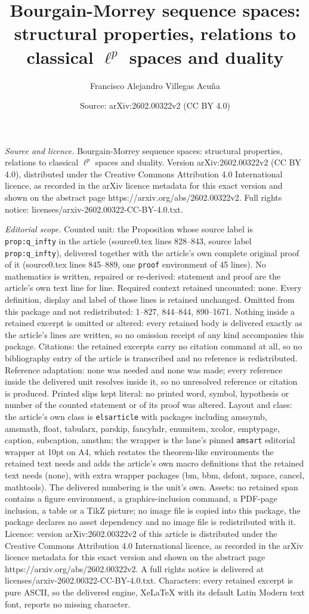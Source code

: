 \documentclass[10pt,a4paper]{amsart}
\title[Bourgain-Morrey sequence spaces: structural properties, rela]{Bourgain-Morrey sequence spaces: structural properties, relations to classical $\ell^{p}$ spaces and duality}
\author{Francisco Alejandro Villegas Acu\~na}
\date{Source: arXiv:2602.00322v2 (CC BY 4.0)}
\begin{document}
\maketitle

\noindent\emph{Source and licence.} Bourgain-Morrey sequence spaces: structural properties, relations to classical $\ell^{p}$ spaces and duality. Version arXiv:2602.00322v2 (CC BY 4.0), distributed under the Creative Commons Attribution 4.0 International licence, as recorded in the arXiv licence metadata for this exact version and shown on the abstract page https://arxiv.org/abs/2602.00322v2. Full rights notice: licenses/arxiv-2602.00322-CC-BY-4.0.txt.\par\smallskip

\noindent\textit{Editorial scope.} Counted unit: the Proposition whose source label is \texttt{prop:q\_infty} in the article (source0.tex lines 828--843, source label \texttt{prop:q\_infty}), delivered together with the article's own complete original proof of it (source0.tex lines 845--889, one \texttt{proof} environment of 45 lines). No mathematics is written, repaired or re-derived: statement and proof are the article's own text line for line. Required context retained uncounted: none. Every definition, display and label of those lines is retained unchanged. Omitted from this package and not redistributed: 1--827, 844--844, 890--1671. Nothing inside a retained excerpt is omitted or altered: every retained body is delivered exactly as the article's lines are written, so no omission receipt of any kind accompanies this package. Citations: the retained excerpts carry no citation command at all, so no bibliography entry of the article is transcribed and no reference is redistributed. Reference adaptation: none was needed and none was made; every reference inside the delivered unit resolves inside it, so no unresolved reference or citation is produced. Printed slips kept literal: no printed word, symbol, hypothesis or number of the counted statement or of its proof was altered. Layout and class: the article's own class is \texttt{elsarticle} with packages including amssymb, amsmath, float, tabularx, parskip, fancyhdr, enumitem, xcolor, emptypage, caption, subcaption, amsthm; the wrapper is the lane's pinned \texttt{amsart} editorial wrapper at 10pt on A4, which restates the theorem-like environments the retained text needs and adds the article's own macro definitions that the retained text needs (none), with extra wrapper packages (bm, bbm, dsfont, xspace, cancel, mathtools). The delivered numbering is the unit's own. Assets: no retained span contains a figure environment, a graphics-inclusion command, a PDF-page inclusion, a table or a TikZ picture; no image file is copied into this package, the package declares no asset dependency and no image file is redistributed with it. Licence: version arXiv:2602.00322v2 of this article is distributed under the Creative Commons Attribution 4.0 International licence, as recorded in the arXiv licence metadata for this exact version and shown on the abstract page https://arxiv.org/abs/2602.00322v2. A full rights notice is delivered at licenses/arxiv-2602.00322-CC-BY-4.0.txt. Characters: every retained excerpt is pure ASCII, so the delivered engine, XeLaTeX with its default Latin Modern text font, reports no missing character.
\end{document}
